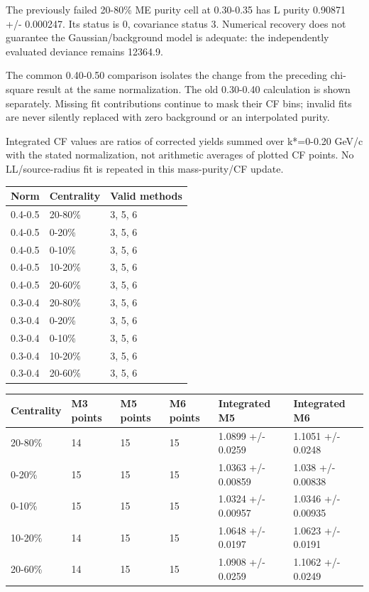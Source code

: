 \documentclass[10pt,a4paper]{article}
\begin{document}
The previously failed 20-80\% ME purity cell at 0.30-0.35 has L purity 0.90871 +/- 0.000247. Its status is 0, covariance status 3. Numerical recovery does not guarantee the Gaussian/background model is adequate: the independently evaluated deviance remains 12364.9.

The common 0.40-0.50 comparison isolates the change from the preceding chi-square result at the same normalization. The old 0.30-0.40 calculation is shown separately. Missing fit contributions continue to mask their CF bins; invalid fits are never silently replaced with zero background or an interpolated purity.

Integrated CF values are ratios of corrected yields summed over k*=0-0.20 GeV/c with the stated normalization, not arithmetic averages of plotted CF points. No LL/source-radius fit is repeated in this mass-purity/CF update.

{\small\setlength{\tabcolsep}{3pt}\begin{longtable}{lll}\toprule
Norm & Centrality & Valid methods\\\midrule\endhead
0.4-0.5 & 20-80\% & 3, 5, 6\\
0.4-0.5 & 0-20\% & 3, 5, 6\\
0.4-0.5 & 0-10\% & 3, 5, 6\\
0.4-0.5 & 10-20\% & 3, 5, 6\\
0.4-0.5 & 20-60\% & 3, 5, 6\\
0.3-0.4 & 20-80\% & 3, 5, 6\\
0.3-0.4 & 0-20\% & 3, 5, 6\\
0.3-0.4 & 0-10\% & 3, 5, 6\\
0.3-0.4 & 10-20\% & 3, 5, 6\\
0.3-0.4 & 20-60\% & 3, 5, 6\\
\bottomrule\end{longtable}}
{\small\setlength{\tabcolsep}{3pt}\begin{longtable}{llllll}\toprule
Centrality & M3 points & M5 points & M6 points & Integrated M5 & Integrated M6\\\midrule\endhead
20-80\% & 14 & 15 & 15 & 1.0899 +/- 0.0259 & 1.1051 +/- 0.0248\\
0-20\% & 15 & 15 & 15 & 1.0363 +/- 0.00859 & 1.038 +/- 0.00838\\
0-10\% & 15 & 15 & 15 & 1.0324 +/- 0.00957 & 1.0346 +/- 0.00935\\
10-20\% & 14 & 15 & 15 & 1.0648 +/- 0.0197 & 1.0623 +/- 0.0191\\
20-60\% & 14 & 15 & 15 & 1.0908 +/- 0.0259 & 1.1062 +/- 0.0249\\
\bottomrule\end{longtable}}
\end{document}
